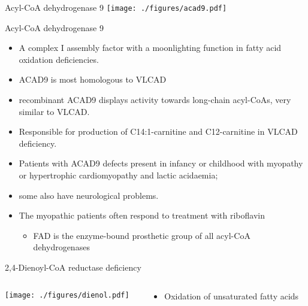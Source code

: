 \documentclass[presentation, smaller]{beamer}
\begin{document}
\begin{frame}[label={sec:orgheadline33}]{Acyl-CoA dehydrogenase 9}
\texttt{[image: ./figures/acad9.pdf]}
\end{frame}
\begin{frame}[label={sec:orgheadline34}]{Acyl-CoA dehydrogenase 9}
\begin{itemize}
\item A complex I assembly factor with a moonlighting function in fatty
acid oxidation deficiencies.
\item ACAD9 is most homologous to VLCAD
\item recombinant ACAD9 displays activity towards long-chain acyl-CoAs,
very similar to VLCAD.
\item Responsible for production of C14:1-carnitine and C12-carnitine in
VLCAD deficiency.
\item Patients with ACAD9 defects present in infancy or childhood with
myopathy or hypertrophic cardiomyopathy and lactic acidaemia;
\item some also have neurological problems.
\item The myopathic patients often respond to treatment with riboflavin
\begin{itemize}
\item FAD is the enzyme-bound prosthetic group of all acyl-CoA
dehydrogenases
\end{itemize}
\end{itemize}
\end{frame}

\begin{frame}[label={sec:orgheadline35}]{2,4-Dienoyl-CoA reductase deficiency}
\begin{columns}
\begin{column}{0.5\columnwidth}
\centering
\texttt{[image: ./figures/dienol.pdf]}
\end{column}
\begin{column}{0.5\columnwidth}
\begin{itemize}
\item Oxidation of unsaturated fatty acids
\end{itemize}
\end{column}
\end{columns}
\end{frame}
\end{document}
